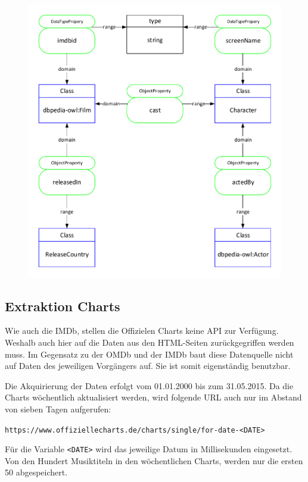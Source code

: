 \documentclass[parskip]{scrartcl}
\begin{document}
\begin{figure}[htbp]
    \centering
    \includegraphics[scale=0.8]{imdb}
\end{figure}

\subsection{Extraktion Charts}

Wie auch die IMDb, stellen die Offizielen Charts keine API zur Verfügung. Weshalb auch hier auf die Daten aus den HTML-Seiten zurückgegriffen werden muss. Im Gegensatz zu der OMDb und der IMDb baut diese Datenquelle nicht auf Daten des jeweiligen Vorgängers auf. Sie ist somit eigenständig benutzbar.

Die Akquirierung der Daten erfolgt vom 01.01.2000 bis zum 31.05.2015. Da die Charts wöchentlich aktualisiert werden, wird folgende URL auch nur im Abstand von sieben Tagen aufgerufen:

\texttt{https://www.offiziellecharts.de/charts/single/for-date-<DATE>}

Für die Variable \texttt{<DATE>} wird das jeweilige Datum in Millisekunden eingesetzt. Von den Hundert Musiktiteln in den wöchentlichen Charts, werden nur die ersten 50 abgespeichert.
\end{document}
